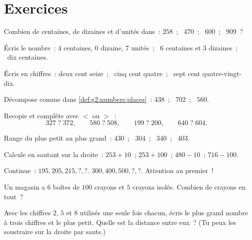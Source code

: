 \section{Exercices}

\begin{exercise}[$\star$]\label{exo:g2:numbers:1}
Combien de centaines, de dizaines et d'unités dans~: $258$~;
\ $470$~; \ $600$~; \ $909$~?
\end{exercise}

\begin{exercise}[$\star$]\label{exo:g2:numbers:2}
Écris le nombre~: $4$ centaines, $0$ dizaine, $7$ unités~; \
$6$ centaines et $3$ dizaines~; \ dix centaines.
\end{exercise}

\begin{exercise}[$\star$]\label{exo:g2:numbers:3}
Écris en chiffres~: deux cent seize~; \ cinq cent quatre~; \
sept cent quatre-vingt-dix.
\end{exercise}

\begin{exercise}[$\star$]\label{exo:g2:numbers:4}
Décompose comme dans \cref{def:g2:numbers:places}~: $438$~; \
$702$~; \ $560$.
\end{exercise}

\begin{exercise}[$\star$]\label{exo:g2:numbers:5}
Recopie et complète avec $<$ ou $>$~:
\[
327 \;?\; 372, \qquad
580 \;?\; 508, \qquad
199 \;?\; 200, \qquad
640 \;?\; 604 .
\]
\end{exercise}

\begin{exercise}[$\star$]\label{exo:g2:numbers:6}
Range du plus petit au plus grand~: $430$~; \ $304$~; \ $340$~; \
$403$.
\end{exercise}

\begin{exercise}[$\star$]\label{exo:g2:numbers:7}
Calcule en sautant sur la droite~: $253 + 10$~; \quad
$253 + 100$~; \quad $480 - 10$~; \quad $716 - 100$.
\end{exercise}

\begin{exercise}[$\star$]\label{exo:g2:numbers:8}
Continue~: $195, 205, 215, ?, ?$. \quad
$300, 400, 500, ?, ?$. \quad Attention au premier~!
\end{exercise}

\begin{exercise}[$\star$]\label{exo:g2:numbers:9}
Un magasin a $6$ boîtes de $100$ crayons et $5$ crayons isolés.
Combien de crayons en tout~?
\end{exercise}

\begin{exercise}[$\star\star$]\label{exo:g2:numbers:10}
Avec les chiffres $2$, $5$ et $8$ utilisés une seule fois chacun,
écris le plus grand nombre à trois chiffres et le plus petit.
Quelle est la distance entre eux~? (Tu peux les soustraire sur la
droite par sauts.)
\end{exercise}
